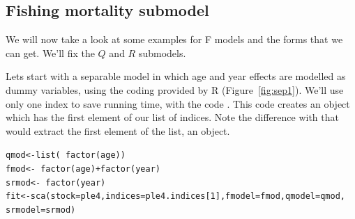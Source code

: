 \documentclass[a4paper,english,10pt]{article}\usepackage[]{graphicx}\usepackage[]{color}
\makeatletter
\newcommand{\hlnum}[1]{\textcolor[rgb]{0.063,0.58,0.627}{#1}}%
\newcommand{\hlopt}[1]{\textcolor[rgb]{0.196,0.196,0.196}{#1}}%
\newcommand{\hlstd}[1]{\textcolor[rgb]{0.196,0.196,0.196}{#1}}%
\newcommand{\hlkwb}[1]{\textcolor[rgb]{0.627,0,0.314}{#1}}%
\newcommand{\hlkwc}[1]{\textcolor[rgb]{0,0.631,0.314}{#1}}%
\newcommand{\hlkwd}[1]{\textcolor[rgb]{0.78,0.227,0.412}{#1}}%
\newenvironment{kframe}{%
 \def\at@end@of@kframe{}%
 \ifinner\ifhmode%
  \def\at@end@of@kframe{\end{minipage}}%
  \begin{minipage}{\columnwidth}%
 \fi\fi%
 \def\FrameCommand##1{\hskip\@totalleftmargin \hskip-\fboxsep
 \colorbox{shadecolor}{##1}\hskip-\fboxsep
     \hskip-\linewidth \hskip-\@totalleftmargin \hskip\columnwidth}%
 \MakeFramed {\advance\hsize-\width
   \@totalleftmargin\z@ \linewidth\hsize
   \@setminipage}}%
 {\par\unskip\endMakeFramed%
 \at@end@of@kframe}
\newenvironment{knitrout}{}{} %
\makeatother
\begin{document}
\subsection{Fishing mortality submodel}

We will now take a look at some examples for F models and the forms that we can get. We'll fix the $Q$ and $R$ submodels.

Lets start with a separable model in which age and year effects are modelled as dummy variables, using the  coding provided by R (Figure~\ref{fig:sep1}). We'll use only one index to save running time, with the code . This code creates an  object which has the first element of our list of indices. Note the difference with  that would extract the first element of the list, an  object.

\begin{knitrout}
\color{fgcolor}\begin{kframe}
\begin{alltt}
\hlstd{qmod} \hlkwb{<-} \hlkwd{list}\hlstd{(}\hlopt{~}\hlkwd{factor}\hlstd{(age))}
\hlstd{fmod} \hlkwb{<-} \hlopt{~}\hlkwd{factor}\hlstd{(age)} \hlopt{+} \hlkwd{factor}\hlstd{(year)}
\hlstd{srmod} \hlkwb{<-} \hlopt{~}\hlkwd{factor}\hlstd{(year)}
\hlstd{fit} \hlkwb{<-} \hlkwd{sca}\hlstd{(}\hlkwc{stock} \hlstd{= ple4,} \hlkwc{indices} \hlstd{= ple4.indices[}\hlnum{1}\hlstd{],} \hlkwc{fmodel} \hlstd{= fmod,} \hlkwc{qmodel} \hlstd{= qmod,}
    \hlkwc{srmodel} \hlstd{= srmod)}
\end{alltt}
\end{kframe}
\end{knitrout}
\end{document}
